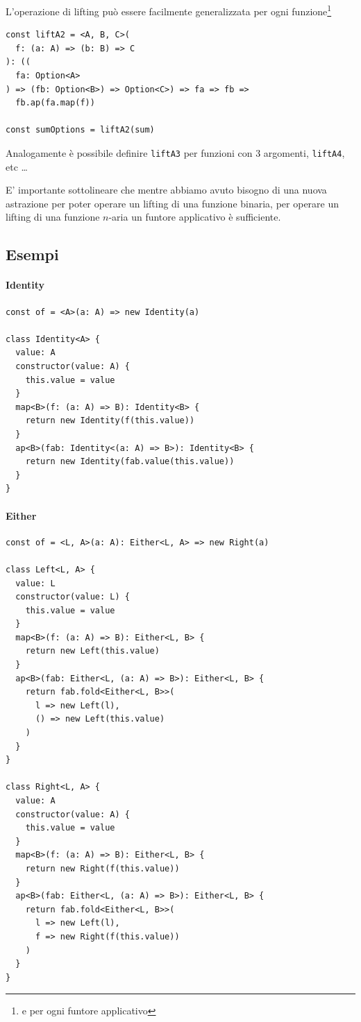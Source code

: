 \documentclass[12pt]{article}
\begin{document}
L'operazione di lifting può essere facilmente generalizzata per ogni funzione\footnote{e per ogni funtore applicativo}

\begin{verbatim}
const liftA2 = <A, B, C>(
  f: (a: A) => (b: B) => C
): ((
  fa: Option<A>
) => (fb: Option<B>) => Option<C>) => fa => fb =>
  fb.ap(fa.map(f))

const sumOptions = liftA2(sum)
\end{verbatim}

Analogamente è possibile definire \texttt{liftA3} per funzioni con 3 argomenti, \texttt{liftA4}, etc \ldots

E' importante sottolineare che mentre abbiamo avuto bisogno di una nuova astrazione per poter operare un lifting di una funzione binaria,
per operare un lifting di una funzione $n$-aria un funtore applicativo è sufficiente.

\subsection{Esempi}

\paragraph{Identity}

\begin{verbatim}
const of = <A>(a: A) => new Identity(a)

class Identity<A> {
  value: A
  constructor(value: A) {
    this.value = value
  }
  map<B>(f: (a: A) => B): Identity<B> {
    return new Identity(f(this.value))
  }
  ap<B>(fab: Identity<(a: A) => B>): Identity<B> {
    return new Identity(fab.value(this.value))
  }
}
\end{verbatim}

\paragraph{Either}

\begin{verbatim}
const of = <L, A>(a: A): Either<L, A> => new Right(a)

class Left<L, A> {
  value: L
  constructor(value: L) {
    this.value = value
  }
  map<B>(f: (a: A) => B): Either<L, B> {
    return new Left(this.value)
  }
  ap<B>(fab: Either<L, (a: A) => B>): Either<L, B> {
    return fab.fold<Either<L, B>>(
      l => new Left(l),
      () => new Left(this.value)
    )
  }
}

class Right<L, A> {
  value: A
  constructor(value: A) {
    this.value = value
  }
  map<B>(f: (a: A) => B): Either<L, B> {
    return new Right(f(this.value))
  }
  ap<B>(fab: Either<L, (a: A) => B>): Either<L, B> {
    return fab.fold<Either<L, B>>(
      l => new Left(l),
      f => new Right(f(this.value))
    )
  }
}
\end{verbatim}
\end{document}
